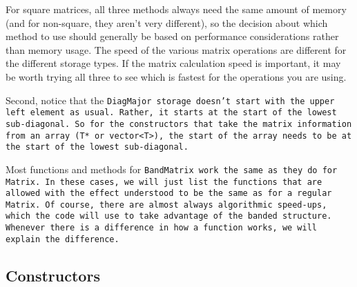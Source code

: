 For square matrices, all three methods always need the same amount of memory 
(and for non-square, they aren't very different), so the 
decision about which method to use should generally be based on performance 
considerations rather than memory usage.
The speed of the various matrix operations are different for the different storage 
types.  If the matrix calculation speed is important, it may be worth trying 
all three to see which is fastest for the operations you are using.

Second, notice that the \tt{DiagMajor} storage doesn't start with the 
upper left element as usual.
Rather, it starts at the start of the lowest sub-diagonal.  
So for the constructors that 
take the matrix information from an array (\tt{T*} or \tt{vector<T>}), 
the start of the array needs to be at the start of the lowest sub-diagonal.  

Most functions and methods for \tt{BandMatrix} 
work the same as they do for \tt{Matrix}.
In these cases, we will just list the functions that are allowed with the
effect understood to be the same as for a regular \tt{Matrix}.  Of course, there are 
almost always algorithmic speed-ups, which the code will use to take advantage of the 
banded structure.
Whenever there is a difference in how a function works,
we will explain the difference.


\subsection{Constructors}
\label{BandMatrix_Constructors}

